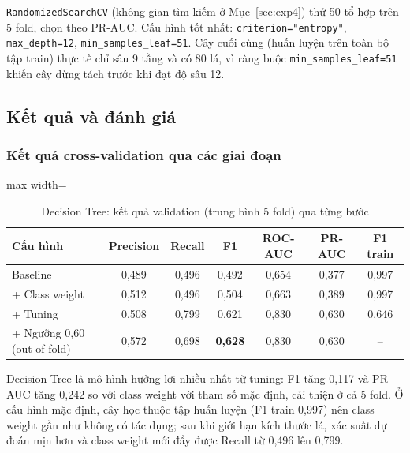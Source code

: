 \texttt{RandomizedSearchCV} (không gian tìm kiếm ở Mục~\ref{sec:exp4}) thử 50 tổ hợp trên 5 fold, chọn theo PR-AUC. Cấu hình tốt nhất: \texttt{criterion="entropy"}, \texttt{max\_depth=12}, \texttt{min\_samples\_leaf=51}. Cây cuối cùng (huấn luyện trên toàn bộ tập train) thực tế chỉ sâu 9 tầng và có 80 lá, vì ràng buộc \texttt{min\_samples\_leaf=51} khiến cây dừng tách trước khi đạt độ sâu 12.

\subsection{Kết quả và đánh giá}

\subsubsection{Kết quả cross-validation qua các giai đoạn}
\begin{table}[H]
\centering
\small
\begin{adjustbox}{max width=\textwidth}
\begin{tabular}{|l|c|c|c|c|c|c|}
\hline
\textbf{Cấu hình} & \textbf{Precision} & \textbf{Recall} & \textbf{F1} & \textbf{ROC-AUC} & \textbf{PR-AUC} & \textbf{F1 train} \\
\hline
Baseline & 0,489 & 0,496 & 0,492 & 0,654 & 0,377 & 0,997 \\
\hline
+ Class weight & 0,512 & 0,496 & 0,504 & 0,663 & 0,389 & 0,997 \\
\hline
+ Tuning & 0,508 & 0,799 & 0,621 & 0,830 & 0,630 & 0,646 \\
\hline
+ Ngưỡng 0,60 (out-of-fold) & 0,572 & 0,698 & \textbf{0,628} & 0,830 & 0,630 & -- \\
\hline
\end{tabular}
\end{adjustbox}
\caption{Decision Tree: kết quả validation (trung bình 5 fold) qua từng bước}
\end{table}

Decision Tree là mô hình hưởng lợi nhiều nhất từ tuning: F1 tăng 0,117 và PR-AUC tăng 0,242 so với class weight với tham số mặc định, cải thiện ở cả 5 fold. Ở cấu hình mặc định, cây học thuộc tập huấn luyện (F1 train 0,997) nên class weight gần như không có tác dụng; sau khi giới hạn kích thước lá, xác suất dự đoán mịn hơn và class weight mới đẩy được Recall từ 0,496 lên 0,799.

